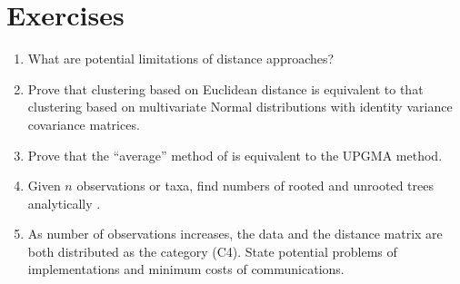 \section{Exercises}
\label{sec:pairwise_exercise}

\begin{enumerate}[label=\thechapter-\arabic*]

\item
What are potential limitations of distance approaches?

\item
Prove that clustering based on Euclidean distance is equivalent to that
clustering based on multivariate Normal distributions with identity variance
covariance matrices.

\item
Prove that the ``average'' method of  is equivalent to the
UPGMA method.

\item
Given $n$ observations or taxa, find numbers of rooted and unrooted trees
analytically .

\item
As number of observations increases, the data and the distance matrix are
both distributed as the category (C4). State potential problems of
implementations and minimum costs of communications.

\end{enumerate}

